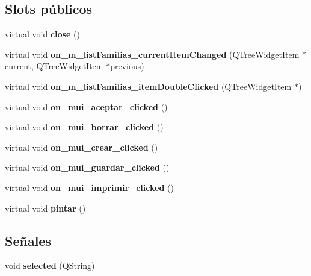 \subsection*{Slots p\'{u}blicos}
\begin{CompactItemize}
\item 
virtual void {\bf close} ()
\item 
virtual void {\bf on\_\-m\_\-list\-Familias\_\-current\-Item\-Changed} (QTree\-Widget\-Item $\ast$current, QTree\-Widget\-Item $\ast$previous)
\item 
virtual void {\bf on\_\-m\_\-list\-Familias\_\-item\-Double\-Clicked} (QTree\-Widget\-Item $\ast$)
\item 
virtual void {\bf on\_\-mui\_\-aceptar\_\-clicked} ()\label{classfamiliasview_i3}

\item 
virtual void {\bf on\_\-mui\_\-borrar\_\-clicked} ()
\item 
virtual void {\bf on\_\-mui\_\-crear\_\-clicked} ()
\item 
virtual void {\bf on\_\-mui\_\-guardar\_\-clicked} ()
\item 
virtual void {\bf on\_\-mui\_\-imprimir\_\-clicked} ()
\item 
virtual void {\bf pintar} ()
\end{CompactItemize}
\subsection*{Se\~{n}ales}
\begin{CompactItemize}
\item 
void {\bf selected} (QString)\label{classfamiliasview_l0}

\end{CompactItemize}
